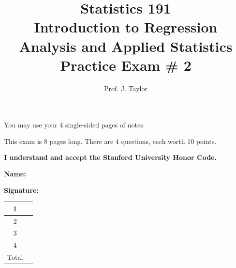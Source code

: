 \documentclass{article}
\begin{document}
\title{Statistics 191 \\ Introduction to Regression Analysis and Applied Statistics \\ Practice Exam \# 2 }
\author{Prof. J.  Taylor}
\date{}
\maketitle 

{\sc You may use your 4 single-sided pages of notes}

{\sc This exam is 8 pages long. There are 4 questions, each worth 10 points.}

\vspace{1in}

\newcommand{\qspace}{\vspace{2in}}

{\bf \sc I understand and accept the Stanford University Honor Code.}

\vspace{0.5in}

{\bf \sc Name:} \underline{\hspace{2.5in}}

\vspace{0.5in}

{\bf \sc Signature:} \underline{\hspace{2.5in}}

\vspace{1in}
\begin{center}
\begin{tabular}{|c|p{0.8in}|} \hline
  1 & \\ \hline
  2 & \\ \hline
  3 & \\ \hline
  4 & \\ \hline
  Total & \\ \hline
\end{tabular}
\end{center}
\end{document}
